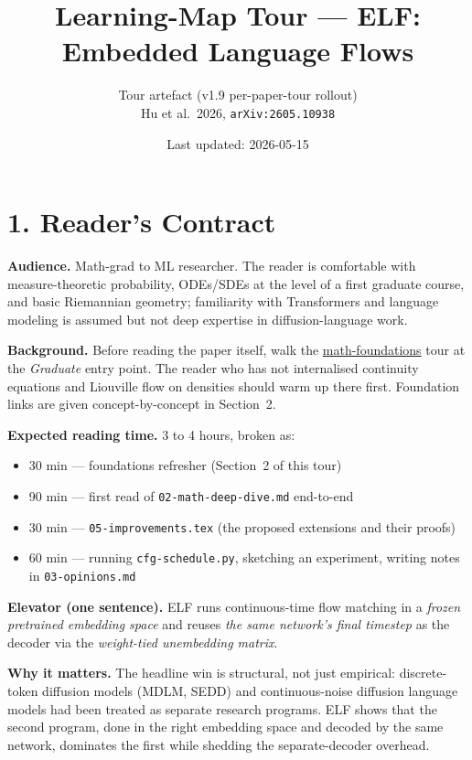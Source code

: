 \documentclass[11pt]{article}
\title{Learning-Map Tour --- ELF: Embedded Language Flows}
\author{Tour artefact (v1.9 per-paper-tour rollout) \\ Hu et al.\ 2026, \texttt{arXiv:2605.10938}}
\date{Last updated: 2026-05-15}
\begin{document}
\maketitle

\section*{1. Reader's Contract}

\textbf{Audience.} Math-grad to ML researcher. The reader is comfortable with measure-theoretic probability, ODEs/SDEs at the level of a first graduate course, and basic Riemannian geometry; familiarity with Transformers and language modeling is assumed but not deep expertise in diffusion-language work.

\textbf{Background.} Before reading the paper itself, walk the \href{https://github.com/pleyva2004/math-foundations}{math-foundations} tour at the \emph{Graduate} entry point. The reader who has not internalised continuity equations and Liouville flow on densities should warm up there first. Foundation links are given concept-by-concept in Section~2.

\textbf{Expected reading time.} 3 to 4 hours, broken as:
\begin{itemize}
  \item 30 min --- foundations refresher (Section~2 of this tour)
  \item 90 min --- first read of \texttt{02-math-deep-dive.md} end-to-end
  \item 30 min --- \texttt{05-improvements.tex} (the proposed extensions and their proofs)
  \item 60 min --- running \texttt{cfg-schedule.py}, sketching an experiment, writing notes in \texttt{03-opinions.md}
\end{itemize}

\textbf{Elevator (one sentence).} ELF runs continuous-time flow matching in a \emph{frozen pretrained embedding space} and reuses \emph{the same network's final timestep} as the decoder via the \emph{weight-tied unembedding matrix}.

\textbf{Why it matters.} The headline win is structural, not just empirical: discrete-token diffusion models (MDLM, SEDD) and continuous-noise diffusion language models had been treated as separate research programs. ELF shows that the second program, done in the right embedding space and decoded by the same network, dominates the first while shedding the separate-decoder overhead.
\end{document}
